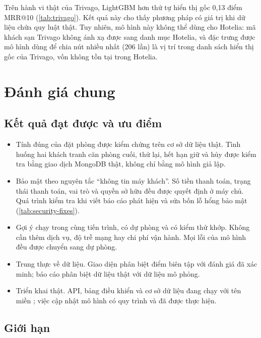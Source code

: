 Trên hành vi thật của Trivago, LightGBM hơn thứ tự hiển thị gốc 0,13 điểm MRR@10 (\cref{tab:trivago}). Kết quả này cho thấy phương pháp có giá trị khi dữ liệu chứa quy luật thật. Tuy nhiên, mô hình này không thể dùng cho Hotelia: mã khách sạn Trivago không ánh xạ được sang danh mục Hotelia, và đặc trưng được mô hình dùng để chia nút nhiều nhất (206 lần) là vị trí trong danh sách hiển thị gốc của Trivago, vốn không tồn tại trong Hotelia.

\section{Đánh giá chung}\label{sec:overall}

\subsection{Kết quả đạt được và ưu điểm}

\begin{itemize}
\item Tính đúng của đặt phòng được kiểm chứng trên cơ sở dữ liệu thật. Tình huống hai khách tranh căn phòng cuối, thử lại, hết hạn giữ và hủy được kiểm tra bằng giao dịch MongoDB thật, không chỉ bằng mô hình giả lập.
\item Bảo mật theo nguyên tắc ``không tin máy khách''. Số tiền thanh toán, trạng thái thanh toán, vai trò và quyền sở hữu đều được quyết định ở máy chủ. Quá trình kiểm tra khi viết báo cáo phát hiện và sửa bốn lỗ hổng bảo mật (\cref{tab:security-fixes}).
\item Gợi ý chạy trong cùng tiến trình, có dự phòng và có kiểm thử khớp. Không cần thêm dịch vụ, độ trễ mạng hay chi phí vận hành. Mọi lỗi của mô hình đều được chuyển sang dự phòng.
\item Trung thực về dữ liệu. Giao diện phân biệt điểm biên tập với đánh giá đã xác minh; báo cáo phân biệt dữ liệu thật với dữ liệu mô phỏng.
\item Triển khai thật. API, bảng điều khiển và cơ sở dữ liệu đang chạy với tên miền ; việc cập nhật mô hình có quy trình và đã được thực hiện.
\end{itemize}

\subsection{Giới hạn}\label{sec:limitations}

